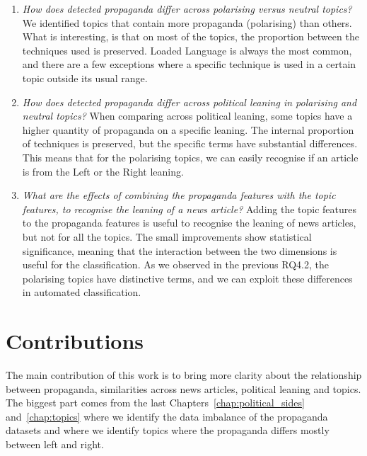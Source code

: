 \begin{enumerate}[label={\textbf{RQ4.\arabic*:}},leftmargin=2cm]
    \item \emph{How does detected propaganda differ across polarising versus neutral topics?} We identified topics that contain more propaganda (polarising) than others. What is interesting, is that on most of the topics, the proportion between the techniques used is preserved. %
    Loaded Language is always the most common, and there are a few exceptions where a specific technique is used in a certain topic outside its usual range.
    \item \emph{How does detected propaganda differ across political leaning in polarising and neutral topics?} When comparing across political leaning, some topics have a higher quantity of propaganda on a specific leaning. The internal proportion of techniques is preserved, but the specific terms have substantial differences. This means that for the polarising topics, we can easily recognise if an article is from the Left or the Right leaning. %
    \item \textit{What are the effects of combining the propaganda features with the topic features, to recognise the leaning of a news article?} Adding the topic features to the propaganda features is useful to recognise the leaning of news articles, but not for all the topics. The small improvements show statistical significance, meaning that the interaction between the two dimensions is useful for the classification. As we observed in the previous RQ4.2, the polarising topics have distinctive terms, and we can exploit these differences in automated classification.
\end{enumerate}




\section{\statusgreen Contributions}
\label{sec:discussion_contributions}

The main contribution of this work is to bring more clarity about the relationship between propaganda, similarities across news articles, political leaning and topics.
The biggest part comes from the last Chapters~\ref{chap:political_sides} and~\ref{chap:topics} where we identify the data imbalance of the propaganda datasets and where we identify topics where the propaganda differs mostly between left and right.

